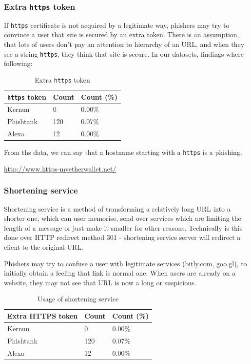 \documentclass[
  digital, %
  oneside, %
  table,   %
  nolof,     %
  nolot,     %
]{fithesis3}
\newcounter{feature}
\newenvironment{feature}[1]{\stepcounter{feature}%
    \tcolorbox[beamer,%
    noparskip,breakable,
    colback=LightBlue,colframe=DarkBlue,%
    colbacklower=DarkBlue!75!LightBlue,%
    title=Feature~\thefeature: #1]}%
    {\endtcolorbox}
\begin{document}
\subsubsection{Extra \texttt{https} token \cite{fresh-phish}}

If \texttt{https} certificate is not acquired by a legitimate way, phishers may try to convince a user that site is secured by an extra token. There is an assumption, that lots of users don't pay an attention to hierarchy of an URL, and when they see a string \texttt{https}, they think that site is secure. In our datasets, findings where following:

\begin{table}[h!]
\begin{tabular}{l|ll}
\texttt{https} token & Count & Count (\%) \\ \hline
Kernun            & 0     & 0.00\%     \\
Phishtank         & 120   & 0.07\%     \\
Alexa             & 12    & 0.00\%    
\end{tabular}
\caption{Extra \texttt{https} token}
\label{table:extra-https}
\end{table}

From ths data, we can say that a hostname starting with a \texttt{https} is a phishing.

\begin{feature}{Extra \texttt{https} token}
\url{http://www.https-myetherwallet.net/}
\end{feature}

\subsubsection{Shortening service \cite{fresh-phish} \cite{phishstorm}}

Shortening service is a method of transforming a relatively long URL into a shorter one, which can user memorise, send over services which are limiting the length of a message or just make it smaller for other reasons. Technically is this done over HTTP redirect method 301 - shortening service server will redirect a client to the original URL.

Phishers may try to confuse a user with legitimate services (\url{bitly.com}, \url{goo.gl}), to initially obtain a feeling that link is normal one. When users are already on a website, they may not see that URL is now a long or suspicious. 

\begin{table}[h!]
\begin{tabular}{l|ll}
Extra HTTPS token & Count & Count (\%) \\ \hline
Kernun            & 0     & 0.00\%     \\
Phishtank         & 120   & 0.07\%     \\
Alexa             & 12    & 0.00\%    
\end{tabular}
\caption{Usage of shortening service}
\label{table:shortening-service}
\end{table}
\end{document}
